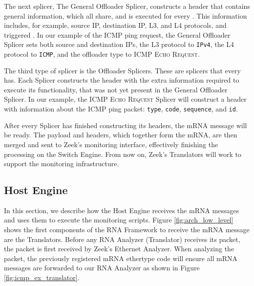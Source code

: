 
The next splicer, The General Offloader Splicer, constructs a header that contains general information, which all \Offloaders{} share, and is executed for every \Offloader{}. This information includes, for example, source IP, destination IP, L3, and L4 protocols, and triggered \Offloader{}. In our example of the ICMP ping request, the General Offloader Splicer sets both source and destination IPs, the L3 protocol to \texttt{IPv4}, the L4 protocol to \texttt{ICMP}, and the offloader type to \textsc{ICMP Echo Request}.

The third type of splicer is the Offloader Splicers. These are splicers that every \Offloader{} has. Each \Offloader{} Splicer constructs the header with the extra information required to execute its functionality, that was not yet present in the General Offloader Splicer. In our example, the \textsc{ICMP Echo Request} Splicer will construct a header with information about the ICMP ping packet: \texttt{type}, \texttt{code}, \texttt{sequence}, and \texttt{id}.




After every Splicer has finished constructing its headers, the mRNA message will be ready. The payload and headers, which together form the mRNA, are then merged and sent to Zeek's monitoring interface, effectively finishing the processing on the Switch Engine. From now on, Zeek's Translators will work to support the monitoring infrastructure.

\subsection{Host Engine}

In this section, we describe how the Host Engine receives the mRNA messages and uses them to execute the monitoring scripts. Figure \ref{fig:arch_low_level} shows the first components of the RNA Framework to receive the mRNA message are the Translators. Before any RNA Analyzer (Translator) receives its packet, the packet is first received by Zeek's Ethernet Analyzer. When analyzing the packet, the previously registered mRNA ethertype code will ensure all mRNA messages are forwarded to our RNA Analyzer as shown in Figure \ref{fig:icmp_ex_translator}.

